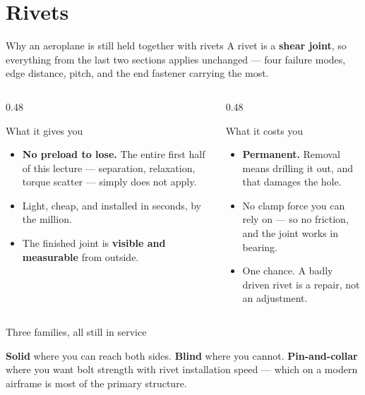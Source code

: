 \documentclass[aspectratio=169,10pt]{beamer}
\begin{document}
\section{Rivets}

\begin{frame}{Why an aeroplane is still held together with rivets}
A rivet is a \textbf{shear joint}, so everything from the last two sections applies unchanged ---
four failure modes, edge distance, pitch, and the end fastener carrying the most.
\vfill
\begin{columns}[T]
\begin{column}{0.48\textwidth}
\begin{block}{What it gives you}
\begin{itemize}\footnotesize
\item \textbf{No preload to lose.} The entire first half of this lecture --- separation, relaxation,
  torque scatter --- simply does not apply.
\item Light, cheap, and installed in seconds, by the million.
\item The finished joint is \textbf{visible and measurable} from outside.
\end{itemize}
\end{block}
\end{column}
\begin{column}{0.48\textwidth}
\begin{alertblock}{What it costs you}
\begin{itemize}\footnotesize
\item \textbf{Permanent.} Removal means drilling it out, and that damages the hole.
\item No clamp force you can rely on --- so no friction, and the joint works in bearing.
\item One chance. A badly driven rivet is a repair, not an adjustment.
\end{itemize}
\end{alertblock}
\end{column}
\end{columns}
\end{frame}

\begin{frame}{Three families, all still in service}
\centering
\resizebox{0.99\textwidth}{!}{}
\vfill
\raggedright
\footnotesize
\textbf{Solid} where you can reach both sides. \textbf{Blind} where you cannot. \textbf{Pin-and-collar}
where you want bolt strength with rivet installation speed --- which on a modern airframe is most of
the primary structure.
\end{frame}
\end{document}
